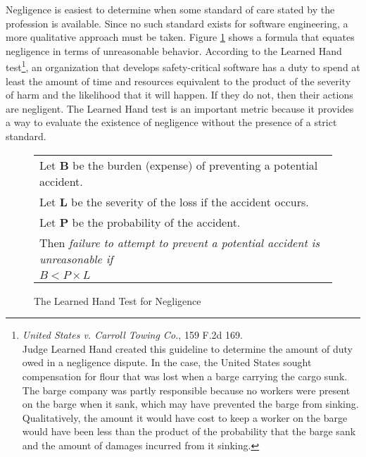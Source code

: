 Negligence is easiest to determine when some standard of care stated by the
profession is available. Since no such standard exists for software engineering,
a more qualitative approach must be taken. Figure \ref{fig:handtest} shows a
formula that equates negligence in terms of unreasonable behavior.  According to
the Learned Hand test\footnote{\textit{United States v. Carroll Towing Co.}, 159
F.2d 169.\\ Judge Learned Hand created this guideline to determine the amount of
duty owed in a negligence dispute. In the case, the United States sought
compensation for flour that was lost when a barge carrying the cargo sunk. The
barge company was partly responsible because no workers were present on the
barge when it sank, which may have prevented the barge from sinking.
Qualitatively, the amount it would have cost to keep a worker on the barge would
have been less than the product of the probability that the barge sank and the
amount of damages incurred from it sinking.}, an organization that develops
safety-critical software has a duty to spend at least the amount of time and
resources equivalent to the product of the severity of harm and the likelihood 
that it will happen. If they do not, then their actions are negligent. The
Learned Hand test is an important metric because it provides a way to evaluate
the existence of negligence without the presence of a strict standard.

\begin{figure}
\begin{narrow}{-1.5in}{-1.5in}\begin{center}
\begin{tabular}{|l|}
\hline
	Let \textbf{B} be the burden (expense) of preventing a potential accident.\\
	Let \textbf{L} be the severity of the loss if the accident occurs.\\
	Let \textbf{P} be the probability of the accident.\\[6pt]
	Then \textit{failure to attempt to prevent a potential accident is 
	unreasonable if}\\[8pt]

      \centerline{\(B < P \times L\)}
\\[3pt]
\hline
\end{tabular}
\end{center}\end{narrow}
\caption{The Learned Hand Test for Negligence}
\label{fig:handtest}
\end{figure}

